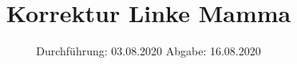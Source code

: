 

\subject{TPS Praktikum}
\title{Korrektur Linke Mamma}
\date{%
	Durchführung: 03.08.2020
	\hspace{3em}
	Abgabe: 16.08.2020
}


\maketitle
\thispagestyle{empty}
\tableofcontents
\newpage





\newpage

\printbibliography{}


